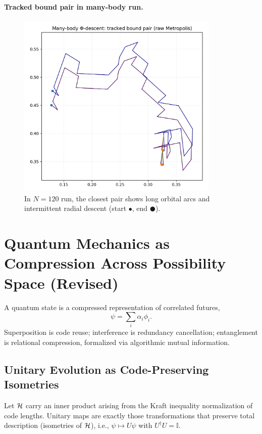 \documentclass[aps,preprint,onecolumn,longbibliography,nofootinbib]{revtex4-2}
\numberwithin{equation}{section}
\begin{document}
\paragraph*{Tracked bound pair in many-body run.}
\begin{figure}[H]
\centering
\includegraphics[width=0.86\textwidth]{figures/orbit_many_body.png}
\caption{In $N{=}120$ run, the closest pair shows long orbital arcs and intermittent radial descent (start $\bullet$, end $\CIRCLE$).}
\label{fig:manypair}
\end{figure}

\section{Quantum Mechanics as Compression Across Possibility Space (Revised)}
A quantum state is a compressed representation of correlated futures,
\begin{equation}
\psi = \sum_i \alpha_i \phi_i. \label{eq:super}
\end{equation}
Superposition is code reuse; interference is redundancy cancellation; entanglement is relational compression, formalized via algorithmic mutual information.

\subsection{Unitary Evolution as Code-Preserving Isometries}
Let ${\cal H}$ carry an inner product arising from the Kraft inequality normalization of code lengths. Unitary maps are exactly those transformations that preserve total description (isometries of ${\cal H}$), i.e., $\psi\mapsto U\psi$ with $U^\dagger U=\mathbb{I}$.
\end{document}
